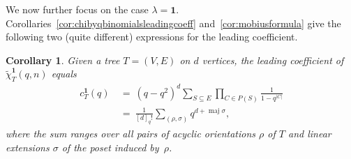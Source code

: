 \documentclass[11pt]{amsart}
\newtheorem{corollary}[theorem]{Corollary}
\newcommand\maj{\operatorname{maj}}
\newcommand\bone{\mathbf{1}}
\begin{document}
We now further focus on the case $\lambda = \bone$.
Corollaries~\ref{cor:chibyqbinomialsleadingcoeff} and~\ref{cor:mobiusformula} give the following two (quite different) expressions for the leading coefficient.

\begin{corollary}\label{cor:c1T}
Given a tree $T=(V,E)$ on $d$ vertices, the leading coefficient of $\widetilde\chi^\bone_T(q,n)$ equals
\begin{align*}
  c^{ \bone }_T (q)
  \ &= \ (q-q^2)^d\sum_{S\subseteq E}\prod_{C \in P(S)}\frac{1}{1-q^{|C|}} \\
    &= \ \frac{1}{[d]_q!} \sum_{(\rho,\sigma)}q^{d+\maj{\sigma}},
\end{align*}
where the sum ranges over all pairs of acyclic orientations $\rho$ of $T$ and linear extensions $\sigma$ of the poset induced by~$\rho$.
\end{corollary}
\end{document}
